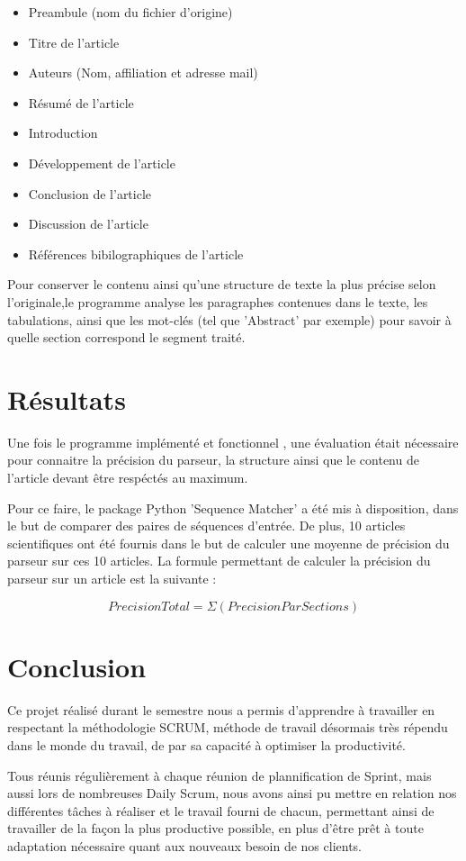 \documentclass[11pt,a4paper]{article}
\begin{document}
\begin{itemize}

\item Preambule (nom du fichier d'origine)
\item Titre de l'article
\item Auteurs (Nom, affiliation et adresse mail)
\item Résumé de l'article
\item Introduction
\item Développement de l'article
\item Conclusion de l'article
\item Discussion de l'article
\item Références bibilographiques de l'article
\end{itemize}

Pour conserver le contenu ainsi qu'une structure de texte la plus précise selon l'originale,le programme analyse les paragraphes contenues dans le texte, les tabulations, ainsi que les mot-clés (tel que 'Abstract' par exemple) pour savoir à quelle section correspond le segment traité.





\section{Résultats}

Une fois le programme implémenté et fonctionnel , une évaluation était nécessaire pour connaitre la précision du parseur, la structure ainsi que le contenu de l'article devant être respéctés au maximum.

Pour ce faire, le package Python 'Sequence Matcher' a été mis à disposition, dans le but de comparer des paires de séquences d'entrée.
De plus, 10 articles scientifiques ont été fournis dans le but de calculer une moyenne de précision du parseur sur ces 10 articles.
La formule permettant de calculer la précision du parseur sur un article est la suivante : 

\[ PrecisionTotal = \Sigma (Precision Par Sections)\]




\section{Conclusion}

Ce projet réalisé durant le semestre nous a permis d'apprendre à travailler en respectant la méthodologie SCRUM, méthode de travail désormais très répendu dans le monde du travail, de par sa capacité à optimiser la productivité.

Tous réunis régulièrement à chaque réunion de plannification de Sprint, mais aussi lors de nombreuses Daily Scrum, nous avons ainsi pu mettre en relation nos différentes tâches à réaliser et le travail fourni de chacun, permettant ainsi de travailler de la façon la plus productive possible, en plus d'être prêt à toute adaptation nécessaire quant aux nouveaux besoin de nos clients.
\end{document}
